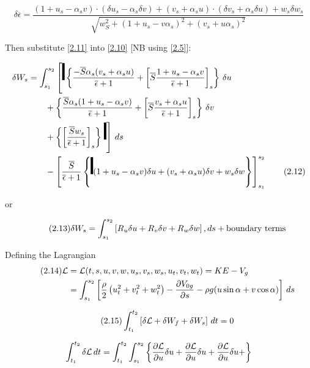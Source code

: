 \documentclass{article}
\begin{document}
\begin{equation}\tag{2.11}\label{2.11}
  \delta\overline{\epsilon} =
  \frac{
    (1+u_s-\alpha_s v)\cdot\left(\delta u_s-\alpha_s\delta v\right)
    + (v_s+\alpha_s u)\cdot\left(\delta v_s+\alpha_s\delta u\right)
    + w_s\delta w_s
  }{
    \sqrt{w_S^2 + (1+u_s-v\alpha_s)^2 + (v_s + u\alpha_s)^2}
  }
\end{equation}

Then substitute \ref{2.11} into \ref{2.10} [NB using \ref{2.5}]:

\begin{align}
  \delta W_s &=
  \ints\left[\embig
    \left\lbrace\frac{-\so\alpha_s(v_s+\alpha_s
      u)}{\eo+1} +
    \left[\so\frac{1+u_s-\alpha_sv}{\eo+1}\right]_s\right\rbrace\,\delta u\right.\nonumber\\
    &{}\qquad
    +  \left\lbrace\frac{\so\alpha_s(1+u_s-\alpha_sv)}{\eo+1}
    + \left[\so\frac{v_s+\alpha_su}{\eo+1}\right]_s\right\rbrace\,\delta v\nonumber\\
    &{}\qquad
    + \left\lbrace\left[\frac{\so w_s}{\eo+1}\right]_s\right\rbrace
    \left.\embig
    \right]\,ds\nonumber\\
  &{}\qquad
  -\left[
  \frac{\so}{\eo+1}
  \left\lbrace\embig
  (1+u_s-\alpha_sv)\delta u +(v_s+\alpha_su)\delta v+w_s\delta w
  \right\rbrace
  \right]_{s_1}^{s_2}\tag{2.12}\label{2.12}
\end{align}

or

\begin{equation}\tag{2.13}\label{2.13}
  \delta W_s=\int_{s_1}^{s_2}
  \left[
    R_u\delta u+R_v\delta v + R_w\delta w\right],ds +
  \mbox{boundary terms}
\end{equation}


Defining the Lagrangian
\begin{align}\tag{2.14}\label{2.14}
  \mathcal{L} &=
  \mathcal{L}(t,s,u,v,w,u_s,v_s,w_s,u_t,v_t,w_t)=KE-V_g\nonumber\\
  & = \int_{s_1}^{s_2}\left[\frac{\rho}{2}\left(u_t^2+v_t^2+w_t^2\right)
  - \frac{\partial V_{0g}}{\partial s}
  - \rho g(u\sin\alpha+v\cos\alpha)\right]\,ds
  \end{align}

\begin{equation}\tag{2.15}\label{2.15}
  \int_{t_1}^{t_2}\left[\delta\mathcal{L} + \delta W_f + \delta
    W_s\right]\,dt=0
\end{equation}


\begin{align}
  \int_{t_1}^{t_2}\delta\mathcal{L}\,dt=\int_{t_1}^{t_2}\int_{s_1}^{s_2}\left\lbrace
  \frac{\partial{\mathcal{L}}}{\partial{u}}\delta u +   \frac{\partial{\mathcal{L}}}{\partial{u}}\delta u +   \frac{\partial{\mathcal{L}}}{\partial{u}}\delta u + 
  \right\rbrace
  \end{align}
\end{document}
